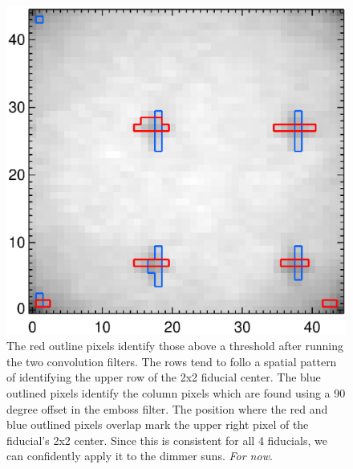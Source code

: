 \documentclass[10pt]{article}
\begin{document}
\begin{figure}[!ht]
    \centering
    \includegraphics[width=.9\textwidth]{plots_tables_images/mask_outline.eps}
    \caption{The red outline pixels identify those above a threshold after running the two convolution filters. The rows tend to follo a spatial pattern of identifying the upper row of the 2x2 fiducial center. The blue outlined pixels identify the column pixels which are found using a 90 degree offset in the emboss filter. The position where the red and blue outlined pixels overlap mark the upper right pixel of the fiducial's 2x2 center. Since this is consistent for all 4 fiducials, we can confidently apply it to the dimmer suns. \emph{For now}.}
\end{figure}
\end{document}

